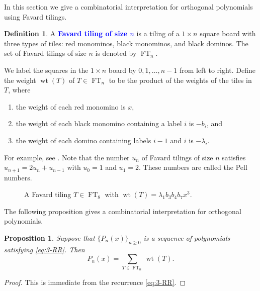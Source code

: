 \documentclass[oneside]{book}
\numberwithin{equation}{section}
\newtheorem{prop}[thm]{Proposition}
\theoremstyle{definition}
\newtheorem{defn}[thm]{Definition}
\newcommand\FT{\operatorname{FT}}
\newcommand\wt{\operatorname{wt}}
\renewcommand\emph[1]{\textcolor{blue}{\bf #1}}
\def\BM#1{\draw [line width=2pt] (#1+0.9,0.9) rectangle +(-0.8,-0.8);}
\def\RM#1{\draw [line width=2pt,red] (#1+0.9,0.9) rectangle +(-0.8,-0.8);}
\def\BD#1{\draw [line width=2pt] (#1+0.9,0.9) rectangle +(-1.8,-0.8);}
\def\LRM#1{\RM{#1} \node at (#1+0.5, 1.3) {$x$};}
\def\LBM#1{\BM{#1} \node at (#1+0.5, 1.3) {$-b_{#1}$};}
\def\LBD#1{\BD{#1} \node at (#1, 1.3) {$-\lambda_{#1}$};}
\begin{document}
In this section we give a combinatorial interpretation for
orthogonal polynomials using Favard tilings.


\begin{defn}
  A \emph{Favard tiling of size $n$} is a tiling of a $1\times n$
  square board with three types of tiles: red monominos, black
  monominos, and black dominos. The set of Favard tilings of size $n$
  is denoted by $\FT_n$.

  We label the squares in the $1\times n$ board by $0,1,\dots,n-1$
  from left to right. Define the weight \( \wt(T) \) of
  \( T\in \FT_n \) to be the product of the weights of the tiles in
  \( T \), where
  \begin{enumerate}
  \item the weight of each red monomino is \( x \),
  \item the weight of each black monomino containing a label
    \( i \) is \( -b_i \), and
  \item the weight of each domino containing labels \( i-1 \) and
    \( i \) is \( -\lambda_i \).
  \end{enumerate}




\end{defn}

For example, see . Note that the number \( u_n \) of
Favard tilings of size \( n \) satisfies \( u_{n+1} = 2u_n+u_{n-1} \)
with \( u_0=1 \) and \( u_1=2 \). These numbers are called the Pell
numbers.

\begin{figure}
  \centering
{}
\caption{A Favard tiling $T\in\FT_8$ with
  $\wt(T)=\lambda_1 b_3b_4b_7x^3$.}
  \label{fig:tiling}
\end{figure}

The following proposition gives a combinatorial interpretation for
orthogonal polynomials.

\begin{prop}\label{pro:Favard}
  Suppose that \( \{ P_n(x) \}_{n\ge 0} \) is a sequence of
  polynomials satisfying \eqref{eq:3-RR}. Then
  \[
    P_n(x) = \sum_{T\in \FT_n} \wt(T).
  \]
\end{prop}
\begin{proof}
  This is immediate from the recurrence \eqref{eq:3-RR}.
\end{proof}
\end{document}
